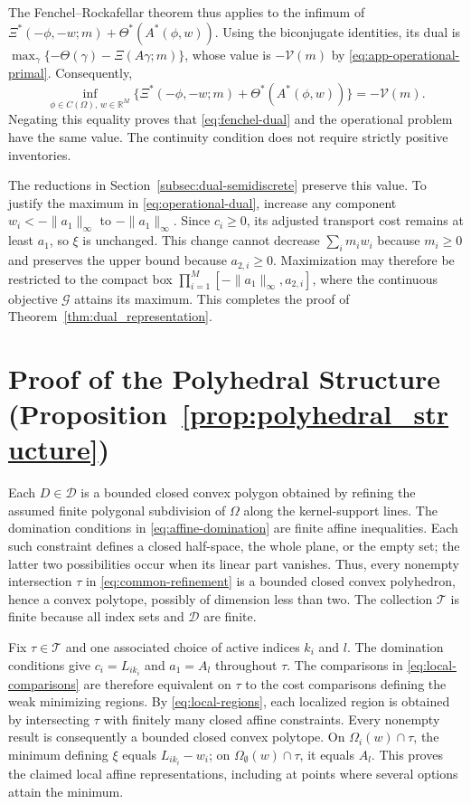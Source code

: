 \documentclass[a4paper,fleqn]{cas-sc}
\theoremstyle{remark}
\theoremstyle{plain}
\begin{document}
The Fenchel--Rockafellar theorem thus applies to the infimum of $\Xi^*(-\phi,-w;m)+\Theta^*(A^*(\phi,w))$. Using the biconjugate identities, its dual is $\max_\gamma\{-\Theta(\gamma)-\Xi(A\gamma;m)\}$, whose value is $-\mathcal V(m)$ by \eqref{eq:app-operational-primal}. Consequently,
\begin{equation}\label{eq:app-fenchel-value}
    \inf_{\phi\in C(\Omega),\,w\in\mathbb R^M}\{\Xi^*(-\phi,-w;m)+\Theta^*(A^*(\phi,w))\}=-\mathcal V(m).
\end{equation}
Negating this equality proves that \eqref{eq:fenchel-dual} and the operational problem have the same value. The continuity condition does not require strictly positive inventories.

The reductions in Section~\ref{subsec:dual-semidiscrete} preserve this value. To justify the maximum in \eqref{eq:operational-dual}, increase any component $w_i<-\|a_1\|_\infty$ to $-\|a_1\|_\infty$. Since $c_i\ge0$, its adjusted transport cost remains at least $a_1$, so $\xi$ is unchanged. This change cannot decrease $\sum_i m_iw_i$ because $m_i\ge0$ and preserves the upper bound because $a_{2,i}\ge0$. Maximization may therefore be restricted to the compact box $\prod_{i=1}^M[-\|a_1\|_\infty,a_{2,i}]$, where the continuous objective $\mathcal G$ attains its maximum. This completes the proof of Theorem~\ref{thm:dual_representation}.

\section{Proof of the Polyhedral Structure (Proposition~\ref{prop:polyhedral_structure})}
\label{app:geometry_proof}

Each $D\in\mathcal D$ is a bounded closed convex polygon obtained by refining the assumed finite polygonal subdivision of $\Omega$ along the kernel-support lines. The domination conditions in \eqref{eq:affine-domination} are finite affine inequalities. Each such constraint defines a closed half-space, the whole plane, or the empty set; the latter two possibilities occur when its linear part vanishes. Thus, every nonempty intersection $\tau$ in \eqref{eq:common-refinement} is a bounded closed convex polyhedron, hence a convex polytope, possibly of dimension less than two. The collection $\mathcal T$ is finite because all index sets and $\mathcal D$ are finite.

Fix $\tau\in\mathcal T$ and one associated choice of active indices $k_i$ and $l$. The domination conditions give $c_i=L_{ik_i}$ and $a_1=A_l$ throughout $\tau$. The comparisons in \eqref{eq:local-comparisons} are therefore equivalent on $\tau$ to the cost comparisons defining the weak minimizing regions. By \eqref{eq:local-regions}, each localized region is obtained by intersecting $\tau$ with finitely many closed affine constraints. Every nonempty result is consequently a bounded closed convex polytope. On $\Omega_i(w)\cap\tau$, the minimum defining $\xi$ equals $L_{ik_i}-w_i$; on $\Omega_\emptyset(w)\cap\tau$, it equals $A_l$. This proves the claimed local affine representations, including at points where several options attain the minimum.
\end{document}
